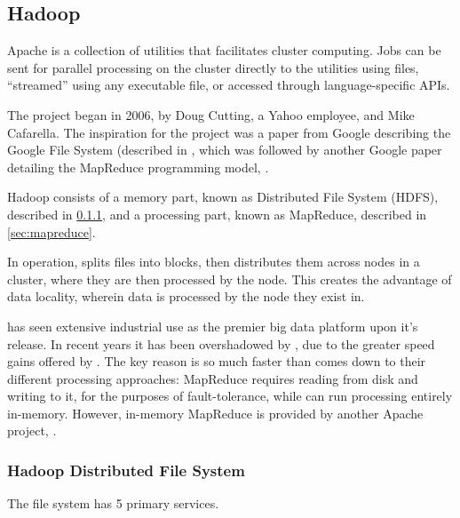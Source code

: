 \subsection{Hadoop}\label{sec:hadoop-1}

Apache  is a collection of utilities that facilitates cluster
computing. Jobs can be sent for parallel processing on the cluster
directly to the utilities using  files, ``streamed'' using any
executable file, or accessed through language-specific APIs.

The project began in 2006, by Doug Cutting, a Yahoo employee, and Mike
Cafarella. The inspiration for the project was a paper from Google
describing the Google File System (described in
\textcite{ghemawat2003google}, which was followed by another Google paper
detailing the MapReduce programming model, \textcite{dean2004mapreduce}.

Hadoop consists of a memory part, known as  Distributed File
System (HDFS), described in \cref{sec:hdfs},
and a processing part, known as MapReduce, described in
\cref{sec:mapreduce}.

In operation,  splits files into blocks, then distributes them
across nodes in a cluster, where they are then processed by the node.
This creates the advantage of data locality, wherein data is processed
by the node they exist in.

 has seen extensive industrial use as the premier big data
platform upon it's release. In recent years it has been overshadowed by
, due to the greater speed gains offered by . The key reason
 is so much faster than  comes down to their different
processing approaches:  MapReduce requires reading from disk and
writing to it, for the purposes of fault-tolerance, while  can run
processing entirely in-memory. However, in-memory MapReduce is provided
by another Apache project, \cite{zheludkov2017high}.

\subsubsection{Hadoop Distributed File System}\label{sec:hdfs}

The file system has 5 primary services.

